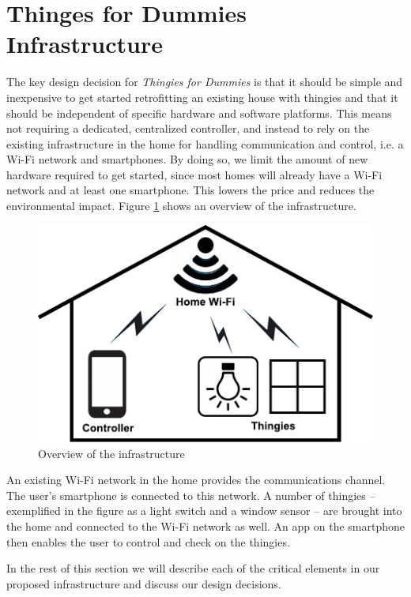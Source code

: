 \documentclass{ubicomp2012}
\begin{document}
\section{Thinges for Dummies Infrastructure}
The key design decision for \textit{Thingies for Dummies} is that it should be simple and  inexpensive to get started retrofitting an existing house with thingies and that it should be independent of specific hardware and software platforms. This means not requiring a dedicated, centralized controller, and instead to rely on the existing infrastructure in the home for handling communication and control, i.e. a Wi-Fi network and smartphones. By doing so, we limit the amount of new hardware required to get started, since most homes will already have a Wi-Fi network and at least one smartphone. This lowers the price and reduces the environmental impact. Figure \ref{fig:infrastructureOverview} shows an overview of the infrastructure.

\begin{figure}[th]
\begin{center}
\includegraphics[width=0.90\columnwidth]{figures/systemoverviewdrawing.pdf}
\end{center}
\caption{Overview of the infrastructure}
\label{fig:infrastructureOverview}
\end{figure}

An existing Wi-Fi network in the home provides the communications channel. The user's smartphone is connected to this network. A number of thingies -- exemplified in the figure as a light switch and a window sensor -- are brought into the home and connected to the Wi-Fi network as well. An app on the smartphone then enables the user to control and check on the thingies.

In the rest of this section we will describe each of the critical elements in our proposed infrastructure and discuss our design decisions.
\end{document}
